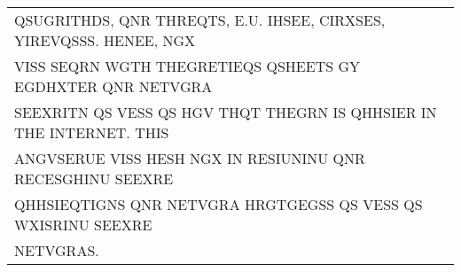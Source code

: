 \documentclass[aspectratio=169, lualatex, handout, 10pt,dvipsnames,svgnames]{beamer} %
\def\enbleu#1{\textcolor{bleu}{#1}}
\begin{document}
\begin{frame}
{\begin{tabular}[t]{l}
      QSUG\enbleu{R}\enbleu{I}\enbleu{T}\enbleu{H}D\enbleu{S}, Q\enbleu{N}R \enbleu{T}\enbleu{H}\enbleu{R}\enbleu{E}Q\enbleu{T}\enbleu{S}, \enbleu{E}.U. \enbleu{I}H\enbleu{S}\enbleu{E}E, C\enbleu{I}\enbleu{R}X\enbleu{S}\enbleu{E}\enbleu{S}, Y\enbleu{I}\enbleu{R}\enbleu{E}VQSS\enbleu{S}. \enbleu{H}\enbleu{E}\enbleu{N}E\enbleu{E}, NGX \\
      V\enbleu{I}SS S\enbleu{E}Q\enbleu{R}\enbleu{N} WG\enbleu{T}\enbleu{H} \enbleu{T}\enbleu{H}\enbleu{E}G\enbleu{R}\enbleu{E}\enbleu{T}\enbleu{I}EQS Q\enbleu{S}H\enbleu{E}E\enbleu{T}\enbleu{S} GY EGDHX\enbleu{T}\enbleu{E}\enbleu{R} Q\enbleu{N}R \enbleu{N}\enbleu{E}\enbleu{T}VG\enbleu{R}A \\
      \enbleu{S}\enbleu{E}EX\enbleu{R}\enbleu{I}\enbleu{T}N Q\enbleu{S} V\enbleu{E}SS Q\enbleu{S} \enbleu{H}GV \enbleu{T}\enbleu{H}Q\enbleu{T} \enbleu{T}\enbleu{H}\enbleu{E}G\enbleu{R}N \enbleu{I}\enbleu{S} QHHS\enbleu{I}\enbleu{E}R \enbleu{I}\enbleu{N} \enbleu{T}\enbleu{H}\enbleu{E} \enbleu{I}\enbleu{N}\enbleu{T}\enbleu{E}\enbleu{R}\enbleu{N}\enbleu{E}\enbleu{T}. \enbleu{T}\enbleu{H}\enbleu{I}\enbleu{S} \\
      A\enbleu{N}GVS\enbleu{E}RU\enbleu{E} V\enbleu{I}SS \enbleu{H}\enbleu{E}SH NGX \enbleu{I}\enbleu{N} R\enbleu{E}\enbleu{S}\enbleu{I}U\enbleu{N}\enbleu{I}\enbleu{N}U Q\enbleu{N}R R\enbleu{E}C\enbleu{E}SGH\enbleu{I}\enbleu{N}U \enbleu{S}\enbleu{E}EX\enbleu{R}\enbleu{E} \\
      QHHS\enbleu{I}EQ\enbleu{T}\enbleu{I}G\enbleu{N}\enbleu{S} Q\enbleu{N}R \enbleu{N}\enbleu{E}\enbleu{T}VG\enbleu{R}A H\enbleu{R}G\enbleu{T}GEGS\enbleu{S} Q\enbleu{S} V\enbleu{E}SS Q\enbleu{S} WX\enbleu{I}SR\enbleu{I}\enbleu{N}U \enbleu{S}\enbleu{E}EX\enbleu{R}\enbleu{E} \\
      \enbleu{N}\enbleu{E}\enbleu{T}VG\enbleu{R}A\enbleu{S}.
    \end{tabular}
  }
  \vspace{0.5cm}

  \normalsize
  \color{black}{Going back to letter frequency and a few more guesses!!} 
  \color{black}
\end{frame}
\end{document}
